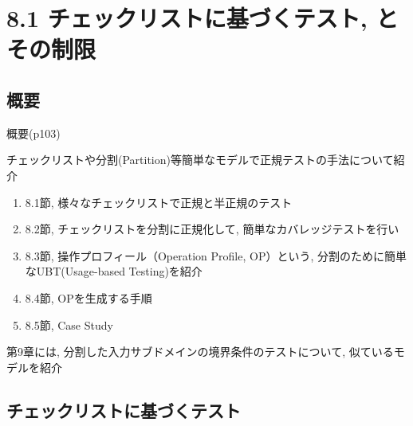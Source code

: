 \section{8.1 チェックリストに基づくテスト, とその制限}
\subsection{概要}
\begin{frame}{概要(p103)}


チェックリストや分割(Partition)等簡単なモデルで正規テストの手法について紹介

\begin{enumerate}
\item 8.1節, 様々なチェックリストで正規と半正規のテスト
\item 8.2節, チェックリストを分割に正規化して, 簡単なカバレッジテストを行い
\item 8.3節, 操作プロフィール（Operation Profile, OP）という,
    分割のために簡単なUBT(Usage-based Testing)を紹介
\item 8.4節, OPを生成する手順
\item 8.5節, Case Study
\end{enumerate}

第9章には, 分割した入力サブドメインの境界条件のテストについて, 似ているモデルを紹介

\end{frame}

\subsection{チェックリストに基づくテスト}

